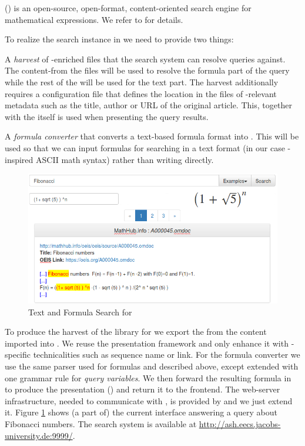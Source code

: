 {\mws} (\mwss)\cite{KohPro:man13} is an open-source, open-format, content-oriented search engine for mathematical
expressions. We refer to \cite{KohPro:man13} for details.

To realize the search instance in \mwss we need to provide two things:
\begin{compactenum}
 \item A \emph{harvest} of \mathml-enriched \html files that the search system can resolve queries against.
 The content-\mathml from the files will be used to resolve the formula part of the query while the rest of the \html
will be used for the text part. The harvest additionally requires a configuration file
that defines the location in the \html files of \mwss-relevant metadata such as the title, author or URL of the
original
article. This, together with the \html itself is used when presenting the query results.
 \item A \emph{formula converter} that converts a text-based formula format into \mathml. This will be used so that
 we can input formulas for searching in a text format (in our case \oeis-inspired ASCII math syntax) rather than
 writing
 \mathml directly.
\end{compactenum}

\begin{figure}
\centering
 \includegraphics[scale=0.45]{search.png}
 \caption{Text and Formula Search for \oeis}\label{fig:search}
\end{figure}

To produce the harvest of the \oeis library for \mwss we export the \html from the content imported
into \mmt. We reuse the \mmt presentation framework and only enhance it with \oeis-specific technicalities such as
sequence name or \oeis link. For the formula converter we use the same parser used for \oeis formulas and described
above, except extended with one
grammar rule for \mwss \emph{query variables}. We then forward the resulting formula in \mmt to produce the
presentation
(\mathml) and return it to the \mwss frontend.  The web-server infrastructure, needed to communicate with \mwss, is
provided
by \mmt and we just extend it. Figure \ref{fig:search} shows (a part of) the current interface answering a query about
Fibonacci numbers. The search system is available at \url{http://ash.eecs.jacobs-university.de:9999/}.




